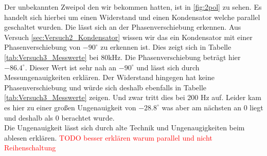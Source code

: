         Der unbekannten Zweipol den wir bekommen hatten, ist in \ref{fig:2pol} zu sehen. Es handelt sich hierbei um einen Widerstand und einen Kondensator welche parallel geschaltet wurden. Die lässt sich an der Phasenverschiebung erkennen. Aus Versuch \ref{sec:Versuch2_Kondensator} wissen wir das ein Kondensator mit einer Phasenverschiebung von $-90^{\circ}$ zu erkennen ist. Dies zeigt sich in Tabelle \ref{tab:Versuch3_Messwerte} bei 80kHz. Die Phasenverschiebung beträgt hier $-86.4^{\circ}$. Dieser Wert ist sehr nah an $-90^{\circ}$ und lässt sich durch Messungenauigkeiten erklären. Der Widerstand hingegen hat keine Phasenverschiebung und würde sich deshalb ebenfalls in Tabelle \ref{tab:Versuch3_Messwerte} zeigen. Und zwar tritt dies bei 200 Hz auf. Leider kam es hier zu einer großen Ungenauigkeit von $-28.8^{\circ}$ was aber am nächsten an 0 liegt und deshalb als 0 berachtet wurde.\\

        \noindent Die Ungenauigkeit lässt sich durch alte Technik und Ungenaugigkeiten beim ablesen erklären. 
        \textcolor{red}{TODO besser erklären warum parallel und nicht Reihenschaltung}